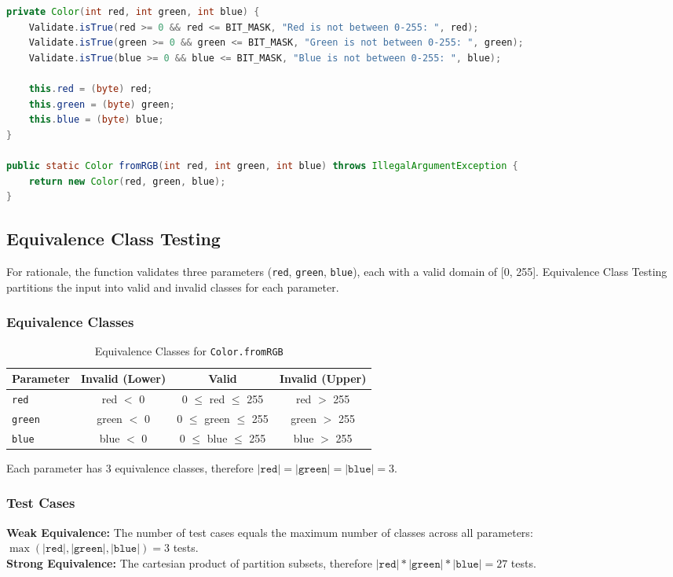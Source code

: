 \documentclass[11pt, a4paper]{article}
\begin{document}
\begin{lstlisting}[language=Java, caption={Color.fromRGB Implementation}]
private Color(int red, int green, int blue) {
    Validate.isTrue(red >= 0 && red <= BIT_MASK, "Red is not between 0-255: ", red);
    Validate.isTrue(green >= 0 && green <= BIT_MASK, "Green is not between 0-255: ", green);
    Validate.isTrue(blue >= 0 && blue <= BIT_MASK, "Blue is not between 0-255: ", blue);

    this.red = (byte) red;
    this.green = (byte) green;
    this.blue = (byte) blue;
}

public static Color fromRGB(int red, int green, int blue) throws IllegalArgumentException {
    return new Color(red, green, blue);
}
\end{lstlisting}

\subsection{Equivalence Class Testing}
For rationale, the function validates three parameters (\texttt{red}, \texttt{green}, \texttt{blue}), each with a valid domain of [0, 255]. Equivalence Class Testing partitions the input into valid and invalid classes for each parameter.

\subsubsection{Equivalence Classes}
\begin{table}[H]
\centering
\caption{Equivalence Classes for \texttt{Color.fromRGB}}
\label{tab:color_equivalence_classes}
\begin{tabular}{lccc}
\toprule
\textbf{Parameter} & \textbf{Invalid (Lower)} & \textbf{Valid} & \textbf{Invalid (Upper)} \\
\midrule
\texttt{red}      & red $<$ 0   & 0 $\leq$ red $\leq$ 255   & red $>$ 255 \\
\texttt{green}    & green $<$ 0 & 0 $\leq$ green $\leq$ 255 & green $>$ 255 \\
\texttt{blue}     & blue $<$ 0  & 0 $\leq$ blue $\leq$ 255  & blue $>$ 255 \\
\bottomrule
\end{tabular}
\end{table}

Each parameter has 3 equivalence classes, therefore $|\texttt{red}| = |\texttt{green}| = |\texttt{blue}| = 3$.

\subsubsection{Test Cases}
\textbf{Weak Equivalence:} The number of test cases equals the maximum number of classes across all parameters: $\max(|\texttt{red}|, |\texttt{green}|, |\texttt{blue}|) = 3$ tests.\\
\textbf{Strong Equivalence:} The cartesian product of partition subsets, therefore $|\texttt{red}| * |\texttt{green}| * |\texttt{blue}| = 27$ tests.
\end{document}
